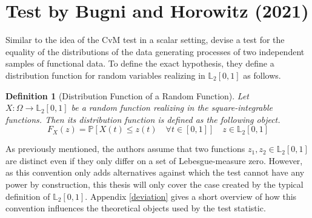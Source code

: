 \documentclass[12pt, a4paper]{article}
\theoremstyle{MAstyle} \newtheorem{assumption}{Assumption}[section]
\theoremstyle{MAstyle} \newtheorem{definition}{Definition}[section]
\theoremstyle{MAstyle} \newtheorem{theorem}{Theorem}[section]
\begin{document}
	\section{Test by Bugni and Horowitz (2021)}\label{Bugni_Horowitz_2021}
	
		Similar to the idea of the CvM test in a scalar setting, \cite{bugni_permutation_2021} devise a test for the equality of the distributions of the data generating processes of two independent samples of functional data. 
		To define the exact hypothesis, they define a distribution function for random variables realizing in $\mathbb{L}_2[0,1]$ as follows.
		\begin{definition}[Distribution Function of a Random Function]\label{dist_func}
			Let $X:\Omega \rightarrow \mathbb{L}_2[0,1]$ be a random function realizing in the square-integrable functions. Then its distribution function is defined as the following object.
			\begin{equation*}
				F_X(z) = \mathbb{P}\left[X(t) \leq z(t) \quad \forall t \in [0,1]\right] \quad z \in \mathbb{L}_2[0,1]
			\end{equation*}
		\end{definition}
		As previously mentioned, the authors assume that two functions $z_1, z_2 \in \mathbb{L}_2[0,1]$ are distinct even if they only differ on a set of Lebesgue-measure zero. However, as this convention only adds alternatives against which the test cannot have any power by construction, this thesis will only cover the case created by the typical definition of $\mathbb{L}_2[0,1]$. Appendix \ref{deviation} gives a short overview of how this convention influences the theoretical objects used by the test statistic.
		
\end{document}

